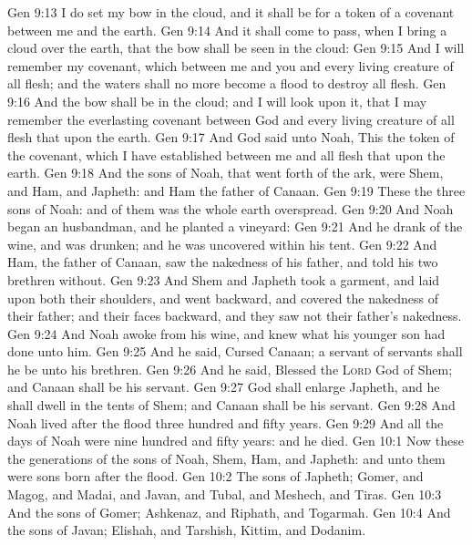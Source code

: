 \vs Gen 9:13 I do set my bow in the cloud, and it shall be for a token of a covenant between me and the earth.
\vs Gen 9:14 And it shall come to pass, when I bring a cloud over the earth, that the bow shall be seen in the cloud:
\vs Gen 9:15 And I will remember my covenant, which  between me and you and every living creature of all flesh; and the waters shall no more become a flood to destroy all flesh.
\vs Gen 9:16 And the bow shall be in the cloud; and I will look upon it, that I may remember the everlasting covenant between God and every living creature of all flesh that  upon the earth.
\vs Gen 9:17 And God said unto Noah, This  the token of the covenant, which I have established between me and all flesh that  upon the earth.
\vs Gen 9:18 And the sons of Noah, that went forth of the ark, were Shem, and Ham, and Japheth: and Ham  the father of Canaan.
\vs Gen 9:19 These  the three sons of Noah: and of them was the whole earth overspread.
\vs Gen 9:20 And Noah began  an husbandman, and he planted a vineyard:
\vs Gen 9:21 And he drank of the wine, and was drunken; and he was uncovered within his tent.
\vs Gen 9:22 And Ham, the father of Canaan, saw the nakedness of his father, and told his two brethren without.
\vs Gen 9:23 And Shem and Japheth took a garment, and laid  upon both their shoulders, and went backward, and covered the nakedness of their father; and their faces  backward, and they saw not their father's nakedness.
\vs Gen 9:24 And Noah awoke from his wine, and knew what his younger son had done unto him.
\vs Gen 9:25 And he said, Cursed  Canaan; a servant of servants shall he be unto his brethren.
\vs Gen 9:26 And he said, Blessed  the \textsc{Lord} God of Shem; and Canaan shall be his servant.
\vs Gen 9:27 God shall enlarge Japheth, and he shall dwell in the tents of Shem; and Canaan shall be his servant.
\vs Gen 9:28 And Noah lived after the flood three hundred and fifty years.
\vs Gen 9:29 And all the days of Noah were nine hundred and fifty years: and he died.
\vs Gen 10:1 Now these  the generations of the sons of Noah, Shem, Ham, and Japheth: and unto them were sons born after the flood.
\vs Gen 10:2 The sons of Japheth; Gomer, and Magog, and Madai, and Javan, and Tubal, and Meshech, and Tiras.
\vs Gen 10:3 And the sons of Gomer; Ashkenaz, and Riphath, and Togarmah.
\vs Gen 10:4 And the sons of Javan; Elishah, and Tarshish, Kittim, and Dodanim.
